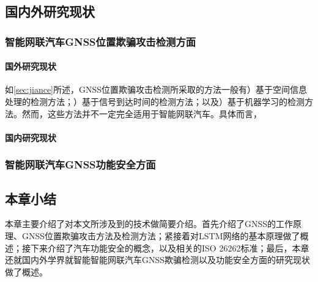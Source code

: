 \subsection{国内外研究现状}
\subsubsection{智能网联汽车GNSS位置欺骗攻击检测方面}
\paragraph{国外研究现状}
\label{国外研究现状GNSS_guowai}
如\ref{sec:jiance}所述，GNSS位置欺骗攻击检测所采取的方法一般有）基于空间信息处理的检测方法；）基于信号到达时间的检测方法；以及）基于机器学习的检测方法。然而，这些方法并不一定完全适用于智能网联汽车。具体而言，

\paragraph{国内研究现状}
\label{GNSS_guonei}

\subsubsection{智能网联汽车GNSS功能安全方面}
\subsection{本章小结}
本章主要介绍了对本文所涉及到的技术做简要介绍。首先介绍了GNSS的工作原理、GNSS位置欺骗攻击方法及检测方法；紧接着对LSTM网络的基本原理做了概述；接下来介绍了汽车功能安全的概念，以及相关的ISO 26262标准；最后，本章还就国内外学界就智能智能网联汽车GNSS欺骗检测以及功能安全方面的研究现状做了概述。
